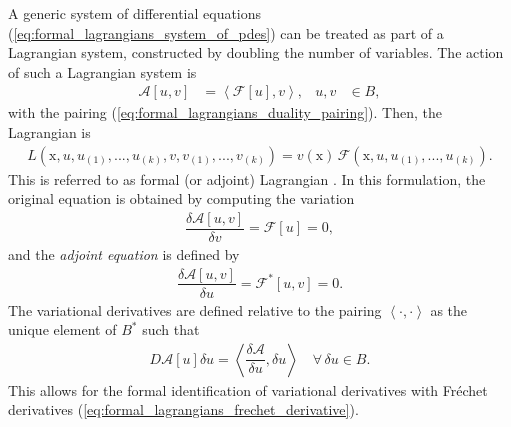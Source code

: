 \documentclass[12pt,a4paper,reqno]{article}
\begin{document}
A generic system of differential equations (\ref{eq:formal_lagrangians_system_of_pdes}) can be treated as part of a Lagrangian system, constructed by doubling the number of variables.
The action of such a Lagrangian system is
\begin{align}\label{eq:formal_lagrangians_action_fa}
\mathcal{A} [{\ensuremath{{\ensuremath{{u}}}}}, {\ensuremath{{\ensuremath{{v}}}}}] &= {\ensuremath{\left < { \mathcal{F} [{\ensuremath{{\ensuremath{{u}}}}}] , {\ensuremath{{\ensuremath{{v}}}}} } \right >}} , &
u , v &\in B ,
\end{align}
with the pairing (\ref{eq:formal_lagrangians_duality_pairing}).
Then, the Lagrangian is
\begin{align}\label{eq:formal_lagrangians_lagrangian_fa}
L ({\ensuremath{{\ensuremath{\mathrm{{x}}}}}}, {\ensuremath{{\ensuremath{{u}}}}}, {\ensuremath{{\ensuremath{{u}}}}}_{(1)}, ..., {\ensuremath{{\ensuremath{{u}}}}}_{(k)}, {\ensuremath{{\ensuremath{{v}}}}}, {\ensuremath{{\ensuremath{{v}}}}}_{(1)}, ..., {\ensuremath{{\ensuremath{{v}}}}}_{(k)}) = {\ensuremath{{\ensuremath{{v}}}}} ({\ensuremath{{\ensuremath{\mathrm{{x}}}}}}) \, \mathcal{F} ({\ensuremath{{\ensuremath{\mathrm{{x}}}}}}, {\ensuremath{{\ensuremath{{u}}}}}, {\ensuremath{{\ensuremath{{u}}}}}_{(1)}, ..., {\ensuremath{{\ensuremath{{u}}}}}_{(k)}) .
\end{align}
This is referred to as formal (or adjoint) Lagrangian \cite{AthertonHomsy:1975, Ibragimov:2006}.
In this formulation, the original equation is obtained by computing the variation 
\begin{align}\label{eq:formal_lagrangians_original_system}
\dfrac{\delta \mathcal{A} [u,v]}{\delta {\ensuremath{{\ensuremath{{v}}}}}} = \mathcal{F} [{\ensuremath{{\ensuremath{{u}}}}}] = 0 ,
\end{align}
and the \emph{adjoint equation} is defined by
\begin{align}\label{eq:formal_lagrangians_adjoint_system}
\dfrac{\delta \mathcal{A} [u,v]}{\delta {\ensuremath{{\ensuremath{{u}}}}}} = \mathcal{F}^{*} [{\ensuremath{{\ensuremath{{u}}}}}, {\ensuremath{{\ensuremath{{v}}}}}] = 0 .
\end{align}
The variational derivatives are defined relative to the pairing ${\ensuremath{\left < { \cdot , \cdot } \right >}}$ as the unique element of $B^{*}$ such that
\begin{align}
{\ensuremath{D}} \mathcal{A} [{\ensuremath{{\ensuremath{{u}}}}}] \delta {\ensuremath{{\ensuremath{{u}}}}} = {\ensuremath{\left < { \dfrac{\delta \mathcal{A}}{\delta {\ensuremath{{\ensuremath{{u}}}}}} , \delta {\ensuremath{{\ensuremath{{u}}}}} } \right >}}
\hspace{1em}
\forall \, \delta {\ensuremath{{\ensuremath{{u}}}}} \in B .
\end{align}
This allows for the formal identification of variational derivatives with Fr\'{e}chet derivatives (\ref{eq:formal_lagrangians_frechet_derivative}).
\end{document}
